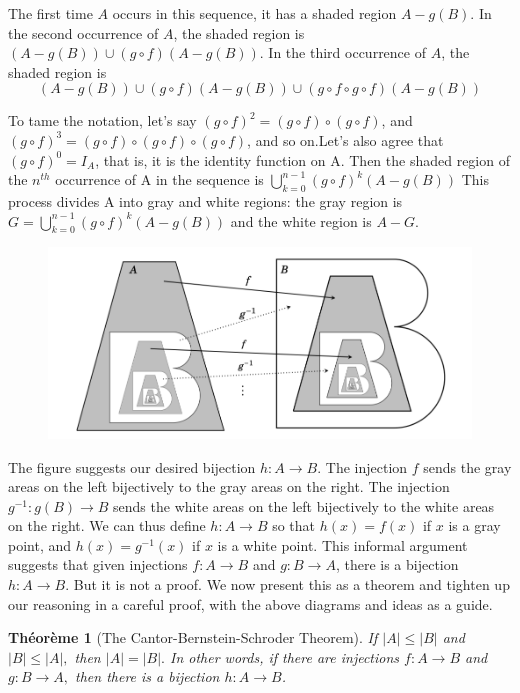 \documentclass[12pt]{book}
\theoremstyle{definition}\newtheorem{dfn}{Définition}[chapter]
\theoremstyle{plain}\newtheorem{thm}{Théorème}[chapter]
\theoremstyle{plain}\newtheorem{prp}{Proposition}[chapter]
\theoremstyle{plain}\newtheorem{lem}{\bf Lemme}[chapter]
\theoremstyle{plain}\newtheorem{axm}{\bf Axiome}[chapter]
\theoremstyle{plain}\newtheorem{lmm}{\bf Lemme}[chapter]
\theoremstyle{plain}\newtheorem{cor}{\bf Corollaire}[chapter]
\theoremstyle{remark}\newtheorem{rem}{Remarque}[chapter]
\begin{document}
The first time $A$ occurs in this sequence, it has a shaded region $A-g(B) .$ In the second occurrence of $A$, the shaded region is $(A-g(B)) \cup(g \circ f)(A-g(B))$. In the third occurrence of $A$, the shaded region is
$$
(A-g(B)) \cup(g \circ f)(A-g(B)) \cup(g \circ f \circ g \circ f)(A-g(B))
$$

To tame the notation, let's say $(g \circ f)^{2}=(g \circ f) \circ(g \circ f)$, and $(g \circ f)^{3}=(g \circ f) \circ(g \circ f) \circ(g \circ f)$, and so on.Let's also agree that $(g \circ f)^{0}=I_{A}$, that is, it is the identity function on $\mathrm{A}$. Then the shaded region of the $n^{th}$ occurrence of $\mathrm{A}$ in the sequence is
$\bigcup\limits_{k=0}^{n-1}(g \circ f)^{k}(A-g(B))$
This process divides A into gray and white regions: the gray region is
$G=\bigcup\limits_{k=0}^{n-1}(g \circ f)^{k}(A-g(B))$
and the white region is $A-G$.
\begin{figure}[H]\centering\includegraphics[width=1.2\textwidth]{image//Vocabulaire de theorie des ensembles//4}\end{figure}
The figure suggests our desired bijection $h: A \rightarrow B$. The
injection $f$ sends the gray areas on the left bijectively to the gray
areas on the right. The injection $g^{-1}: g(B) \rightarrow B$ sends
the white areas on the left bijectively to the white areas on the
right. We can thus define $h: A \rightarrow B$ so that $h(x)=f(x)$ if
$x$ is a gray point, and $h(x)=g^{-1}(x)$ if $x$ is a white point.
This informal argument suggests that given injections $f: A \rightarrow B$ and $g: B \rightarrow A$, there is a bijection $h: A \rightarrow B$. But it is not a proof. We now present this as a theorem and tighten up our reasoning in a careful proof, with the above diagrams and ideas as a guide.
\begin{thm}[The Cantor-Bernstein-Schroder Theorem]
If $|A| \leq|B|$ and $|B| \leq|A|,$ then $|A|=|B| .$ In other words, if there are injections $f: A \rightarrow B$ and $g: B \rightarrow A,$ then there is a bijection $h: A \rightarrow B$.
\end{thm}
\end{document}
